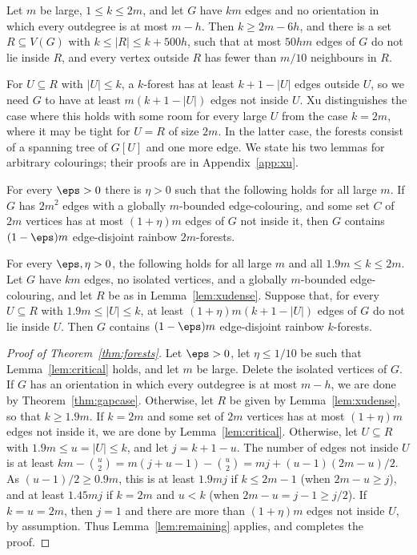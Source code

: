 \begin{lemma}[{Xu~\cite[Lemma~4.1]{Xu}}]\label{lem:xudense}
Let $m$ be large, $1\le k\le2m$, and let $G$ have $km$ edges and no orientation in which every outdegree is at most $m-h$. Then $k\ge2m-6h$, and there is a set $R\subseteq V(G)$ with $k\le|R|\le k+500h$, such that at most $50hm$ edges of $G$ do not lie inside $R$, and every vertex outside $R$ has fewer than $m/10$ neighbours in $R$.
\end{lemma}

For $U\subseteq R$ with $|U|\le k$, a $k$-forest has at least $k+1-|U|$ edges outside $U$, so we need $G$ to have at least $m(k+1-|U|)$ edges not inside $U$.
Xu distinguishes the case where this holds with some room for every large $U$ from the case $k=2m$, where it may be tight for $U=R$ of size $2m$.
In the latter case, the forests consist of a spanning tree of $G[U]$ and one more edge.
We state his two lemmas for arbitrary colourings; their proofs are in Appendix~\ref{app:xu}.

\begin{lemma}\label{lem:critical}
For every $\eps>0$ there is $\eta>0$ such that the following holds for all large $m$. If $G$ has $2m^2$ edges with a globally $m$-bounded edge-colouring, and some set $C$ of $2m$ vertices has at most $(1+\eta)m$ edges of $G$ not inside it, then $G$ contains $(1-\eps)m$ edge-disjoint rainbow $2m$-forests.
\end{lemma}

\begin{lemma}\label{lem:remaining}
For every $\eps,\eta>0$, the following holds for all large $m$ and all $1.9m\le k\le2m$. Let $G$ have $km$ edges, no isolated vertices, and a globally $m$-bounded edge-colouring, and let $R$ be as in Lemma~\ref{lem:xudense}. Suppose that, for every $U\subseteq R$ with $1.9m\le|U|\le k$, at least $(1+\eta)m(k+1-|U|)$ edges of $G$ do not lie inside $U$. Then $G$ contains $(1-\eps)m$ edge-disjoint rainbow $k$-forests.
\end{lemma}

\begin{proof}[Proof of Theorem~\ref{thm:forests}]
Let $\eps>0$, let $\eta\le1/10$ be such that Lemma~\ref{lem:critical} holds, and let $m$ be large. Delete the isolated vertices of $G$.
If $G$ has an orientation in which every outdegree is at most $m-h$, we are done by Theorem~\ref{thm:gapcase}.
Otherwise, let $R$ be given by Lemma~\ref{lem:xudense}, so that $k\ge1.9m$.
If $k=2m$ and some set of $2m$ vertices has at most $(1+\eta)m$ edges not inside it, we are done by Lemma~\ref{lem:critical}.
Otherwise, let $U\subseteq R$ with $1.9m\le u=|U|\le k$, and let $j=k+1-u$.
The number of edges not inside $U$ is at least $km-\binom u2=m(j+u-1)-\binom u2=mj+(u-1)(2m-u)/2$.
As $(u-1)/2\ge0.9m$, this is at least $1.9mj$ if $k\le2m-1$ (when $2m-u\ge j$), and at least $1.45mj$ if $k=2m$ and $u<k$ (when $2m-u=j-1\ge j/2$).
If $k=u=2m$, then $j=1$ and there are more than $(1+\eta)m$ edges not inside $U$, by assumption.
Thus Lemma~\ref{lem:remaining} applies, and completes the proof.
\end{proof}
